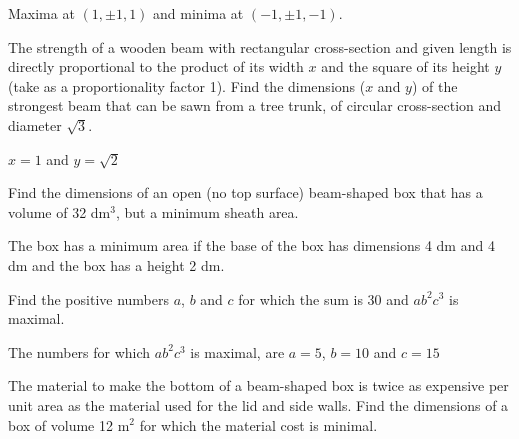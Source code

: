 \begin{Answer}
    Maxima at $(1,\pm 1, 1)$ and minima at $(-1,\pm 1, -1)$. 
\end{Answer}

\ifcalculus\begin{Exercise}[difficulty = 2]\fi\ifanalysis\begin{Exercise}[difficulty = 1]\fi The strength of a wooden beam with rectangular cross-section and given length is directly proportional to the product of its width $x$ and the square of its height $y$ (take as a proportionality factor 1). Find the dimensions ($x$ and $y$) of the strongest beam that can be sawn from a tree trunk, of circular cross-section and diameter $\sqrt{3}$.
\ifanalysis\end{Exercise}\fi\ifcalculus\end{Exercise}\fi

\begin{Answer}
    $x=1$ and $y=\sqrt{2}$
\end{Answer}

\begin{Exercise}[difficulty = 2] Find the dimensions of an open (no top surface) beam-shaped box that has a volume of 32 dm$^3$, but a minimum sheath area.
\end{Exercise}

\begin{Answer}
    The box has a minimum area if the base of the box has dimensions 4 dm and 4 dm and the box has a height 2 dm.
\end{Answer}

\ifcalculus\begin{Exercise}[difficulty = 2]\fi\ifanalysis\begin{Exercise}[difficulty = 1]\fi Find the positive numbers $a$, $b$ and $c$ for which the sum is 30 and $ab^2c^3$ is maximal. 
\ifanalysis\end{Exercise}\fi\ifcalculus\end{Exercise}\fi

\begin{Answer}
    The numbers for which $ab^2c^3$ is maximal, are $a=5$, $b=10$ and $c=15$
\end{Answer}

\begin{Exercise}[difficulty = 2] The material to make the bottom of a beam-shaped box is twice as expensive per unit area as the material used for the lid and side walls. Find the dimensions of a box of volume  12 m$^2$ for which the material cost is minimal.
\end{Exercise}

